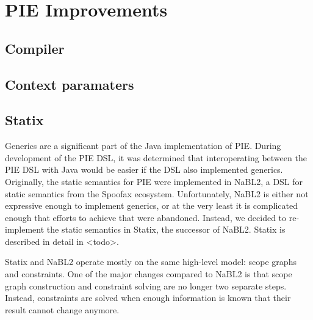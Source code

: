 \chapter{\label{chap:pie_improvements}PIE Improvements}

\section{\label{sec:solution__compiler}Compiler}

\section{\label{sec:solution__context_paramaters}Context paramaters}

\section{\label{sec:solution__statix}Statix}
Generics are a significant part of the Java implementation of \ac{PIE}.
During development of the \ac{PIE} \ac{DSL}, it was determined that interoperating between the \ac{PIE} \ac{DSL} with Java would be easier if the \ac{DSL} also implemented generics.
Originally, the static semantics for \ac{PIE} were implemented in NaBL2, a \ac{DSL} for static semantics from the Spoofax ecosystem.
Unfortunately, \ac{NaBL2} is either not expressive enough to implement generics, or at the very least it is complicated enough that efforts to achieve that were abandoned. 
Instead, we decided to re-implement  the static semantics in Statix, the successor of \ac{NaBL2}.
Statix is described in detail in <todo>.

Statix and \ac{NaBL2} operate mostly on the same high-level model: scope graphs and constraints.
One of the major changes compared to \ac{NaBL2} is that scope graph construction and constraint solving are no longer two separate steps.
Instead, constraints are solved when enough information is known that their result cannot change anymore.

